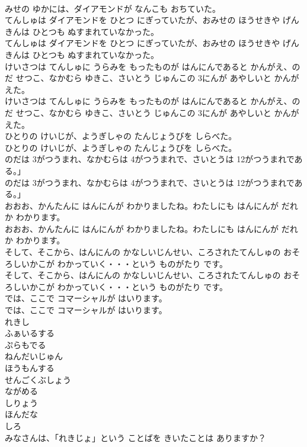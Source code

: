 \documentclass[8pt]{extreport}
\begin{document}
\begin{CJK}{UTF8}{min}
\\	みせの ゆかには、ダイアモンドが なんこも おちていた。
\\	てんしゅは ダイアモンドを ひとつ にぎっていたが、おみせの ほうせきや げんきんは ひとつも ぬすまれていなかった。
\\	てんしゅは ダイアモンドを ひとつ にぎっていたが、おみせの ほうせきや げんきんは ひとつも ぬすまれていなかった。
\\	けいさつは てんしゅに うらみを もったものが はんにんであると かんがえ、のだ せつこ、なかむら ゆきこ、さいとう じゅんこの 3にんが あやしいと かんがえた。
\\	けいさつは てんしゅに うらみを もったものが はんにんであると かんがえ、のだ せつこ、なかむら ゆきこ、さいとう じゅんこの 3にんが あやしいと かんがえた。
\\	ひとりの けいじが、ようぎしゃの たんじょうびを しらべた。
\\	ひとりの けいじが、ようぎしゃの たんじょうびを しらべた。
\\	のだは 3がつうまれ、なかむらは 4がつうまれで、さいとうは 12がつうまれである。」
\\	のだは 3がつうまれ、なかむらは 4がつうまれで、さいとうは 12がつうまれである。」
\\	おおお、かんたんに はんにんが わかりましたね。わたしにも はんにんが だれか わかります。
\\	おおお、かんたんに はんにんが わかりましたね。わたしにも はんにんが だれか わかります。
\\	そして、そこから、はんにんの かなしいじんせい、ころされたてんしゅの おそろしいかこが わかっていく・・・という ものがたり です。
\\	そして、そこから、はんにんの かなしいじんせい、ころされたてんしゅの おそろしいかこが わかっていく・・・という ものがたり です。
\\	では、ここで コマーシャルが はいります。
\\	では、ここで コマーシャルが はいります。
\\	れきし
\\	ふぁいるする
\\	ぷらもでる
\\	ねんだいじゅん
\\	ほうもんする
\\	せんごくぶしょう
\\	ながめる
\\	しりょう
\\	ほんだな
\\	しろ
\\	みなさんは、「れきじょ」という ことばを きいたことは ありますか？

\end{CJK}
\end{document}
